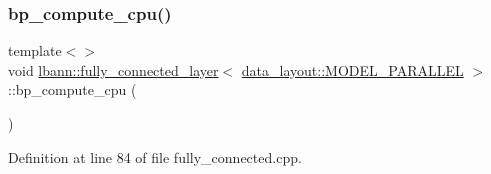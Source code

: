 \subsubsection{\texorpdfstring{bp\+\_\+compute\+\_\+cpu()}{bp\_compute\_cpu()}\hspace{0.1cm}{\footnotesize\ttfamily [1/3]}}
{\footnotesize\ttfamily template$<$$>$ \\
void \hyperlink{classlbann_1_1fully__connected__layer}{lbann\+::fully\+\_\+connected\+\_\+layer}$<$ \hyperlink{base_8hpp_a786677cbfb3f5677b4d84f3056eb08dbac94d7b0e44ab8bdcdad694a673cdeae0}{data\+\_\+layout\+::\+M\+O\+D\+E\+L\+\_\+\+P\+A\+R\+A\+L\+L\+EL} $>$\+::bp\+\_\+compute\+\_\+cpu (\begin{DoxyParamCaption}{ }\end{DoxyParamCaption})\hspace{0.3cm}{\ttfamily [private]}}



Definition at line 84 of file fully\+\_\+connected.\+cpp.


